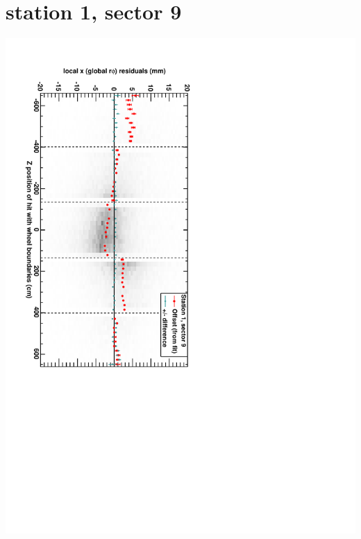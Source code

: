 \documentclass[compress]{beamer}
\begin{document}
\section*{station 1, sector 9}
\begin{frame} \vfill \mbox{\hspace{-1 cm}\includegraphics[height=1.2\linewidth, angle=90]{DTrphiVsZ_st1_sr09.pdf}} \end{frame}
\end{document}
